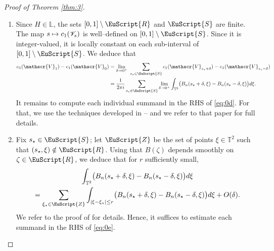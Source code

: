 \documentclass[10pt]{amsart}
\let\pazocal\EuScript
\def\mto{\mathchoice{\longmapsto}{\mapsto}{\mapsto}{\mapsto}}
\theoremstyle{definition}
\DeclareMathOperator{\Id}{Id}
\DeclareMathOperator{\Tr}{Tr}
\newcommand{\EE}{\pazocal{E}}
\newcommand{\RRR}{\pazocal{R}}
\newcommand{\SSS}{{\pazocal{S}}}
\newcommand{\ZZZ}{{\pazocal{Z}}}
\newcommand{\VVV}{{\mathscr{V}}}
\newcommand{\Ll}{\mathbb{L}}
\newcommand{\Tt}{{\mathbb{T}}}
\newcommand{\tsigma}{{\tilde{\sigma}}}
\newcommand{\lr}[1]{\langle #1 \rangle}
\providecommand{\eg}{e.g.}\providecommand{\ie}{i.e.}\providecommand{\etc}{etc.}\providecommand{\resp}{resp.}\providecommand{\cf}{cf.}
\begin{document}
\begin{proof}[Proof of Theorem \ref{thm:3}]
\begin{enumerate}
In Step 6, we will use the space of $2 \times 2$ traceless Hermitian matrices $\EE_0$. This space is equipped with the Hermitian inner product $\lr{T_1,T_2} = \Tr(T_1T_2)$; the Pauli matrices $\sigma_1, \sigma_2, \sigma_3$ form an orthonormal basis. If $\tsigma_1, \tsigma_2, \tsigma_3$ is another orthonormal basis, then there exists $U \in SU(2)$ (unique up to multiplication by $\pm \Id_2$) and $\epsilon \in \{\pm 1\}$ such that
\begin{equation}\label{eq:0h}
\tsigma_k = \epsilon \cdot U \sigma_k U^*, \quad 1 \leq k \leq 3.
\end{equation}
This is precisely the content of the isomorphism between $SU(2) / \{\pm \Id_2\}$ and $SO(3)$; see \eg \cite[\S4.2]{S05}. The number $\epsilon \in \{\pm 1\}$ reads as the determinant of the (orthogonal) matrix of the basis $(\tsigma_1, \tsigma_2, \tsigma_3)$ in the basis $(\sigma_1, \sigma_2, \sigma_3)$.

\item
Since $H \in \Ll$, the sets $[0,1] \setminus \RRR$ and $\SSS$ are finite. The map $s \mto c_1(\VVV_s)$ is well--defined on $[0,1] \setminus \SSS$. Since it is integer-valued, it is locally constant on each sub-interval of $[0,1] \setminus \SSS$. We deduce that
\begin{equation}\label{eq:0d}
\begin{split}
c_1(\VVV_1) - c_1(\VVV_0) &= \lim_{\delta \to 0^+} \ \sum_{s_\star \in \SSS} c_1(\VVV_{s_\star+\delta}) - c_1(\VVV_{s_\star-\delta})
\\
&= \dfrac{1}{2\pi i} \sum_{s_\star \in \SSS} \lim_{\delta \to 0^+} \int_{\Tt^2} \bigl(B_n(s_\star+\delta,\xi) - B_n(s_\star-\delta,\xi) \bigr) d\xi.
\end{split}
\end{equation}
It remains to compute each individual summand in the RHS of \eqref{eq:0d}. For that, we use the techniques developed in \cite[\S2]{D19b} -- and we refer to that paper for full details.

\item
Fix $s_\star \in \SSS$; let $\ZZZ$ be the set of points $\xi \in \Tt^2$ such that $(s_\star,\xi) \notin \RRR$. Using that $B(\zeta)$ depends smoothly on $\zeta \in \RRR$, we deduce that for $r$ sufficiently small,
\begin{multline}\label{eq:0e}
\int_{\Tt^2} \bigl(B_n(s_\star+\delta,\xi) - B_n(s_\star-\delta,\xi) \bigr) d\xi\\
= \sum_{\xi_\star \in \ZZZ} \int_{|\xi-\xi_\star| \leq r} \bigl(B_n(s_\star+\delta,\xi) - B_n(s_\star-\delta,\xi) \bigr) d\xi + O(\delta).
\end{multline}
We refer to the proof of \cite[Lem.\,2.1]{D19b} for details. Hence, it suffices to estimate each summand in the RHS of \eqref{eq:0e}.


\end{enumerate}
\end{proof}
\end{document}

